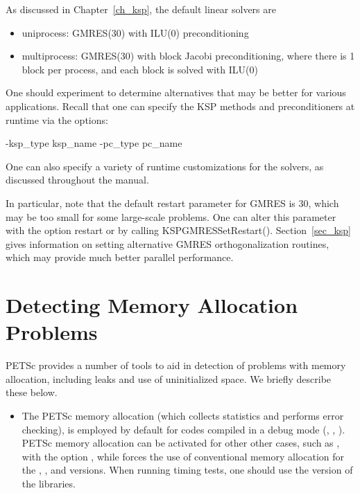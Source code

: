 {{As discussed in Chapter~\ref{ch_ksp}, the default linear solvers are
\begin{itemize}
\item uniprocess: GMRES(30) with ILU(0) preconditioning\\
\item multiprocess: GMRES(30) with block Jacobi preconditioning, where there
                     is 1 block per process, and each block is solved with ILU(0)\\
\end{itemize}
One should experiment to determine alternatives that may be better for
various applications.  Recall that one can specify the KSP methods and
preconditioners at runtime via the options:
\begin{tabbing}
   -ksp\_type \trl{<}ksp\_name\trl{>} -pc\_type \trl{<}pc\_name\trl{>}
\end{tabbing}
One can also specify a variety of runtime customizations for the
solvers, as discussed throughout the manual.

In particular, note that the default restart parameter for GMRES is
30, which may be too small for some large-scale problems.  One can alter this
parameter with the option  \trl{<}restart\trl{>} or by
calling KSPGMRESSetRestart(). Section~\ref{sec_ksp} gives
information on setting alternative GMRES orthogonalization routines,
which may provide much better parallel performance.

\section{Detecting Memory Allocation Problems}

PETSc provides a number of tools to aid in detection of problems
with memory allocation, including leaks and use of uninitialized space.
We briefly describe these below.
 

 
\begin{itemize}
\item The PETSc memory allocation (which collects statistics and performs
error checking), is employed by default for codes compiled in a
debug mode (, , ).
PETSc memory allocation can be activated for other other cases, such
as , with the option , while  forces the use of conventional memory allocation for the
, , and  versions.
When running timing tests, one should use  
the  version of the libraries.


\end{itemize}}}
